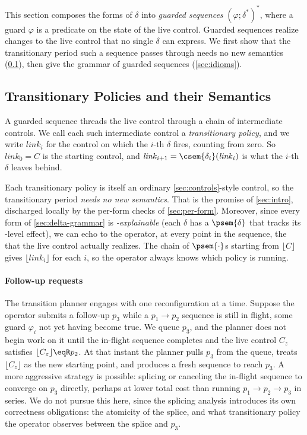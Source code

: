This section composes the forms of \(\delta\) into \emph{guarded sequences} \((\varphi ; \delta^{*})^{*}\), where a guard \(\varphi\) is a predicate on the state of the live control.
Guarded sequences realize changes to the live control that no single \(\delta\) can express.
We first show that the transitionary period such a sequence passes through needs no new semantics (\cref{sec:links}), then give the grammar of guarded sequences (\cref{sec:idioms}).

\subsection{Transitionary Policies and their Semantics}\label{sec:links}

A guarded sequence threads the live control through a chain of intermediate controls.
We call each such intermediate control a \emph{transitionary policy}, and we write \(\mathit{link}_i\) for the control on which the \(i\)-th \(\delta\) fires, counting from zero.
So \(\mathit{link}_0 = C\) is the starting control, and \(\mathit{link}_{i+1} = \csem{\delta_i}(\mathit{link}_i)\) is what the \(i\)-th \(\delta\) leaves behind.

Each transitionary policy is itself an ordinary \cref{sec:controls}-style control, so the transitionary period \emph{needs no new semantics}.
That is the promise of \cref{sec:intro}, discharged locally by the per-form checks of \cref{sec:per-form}.
Moreover, since every form of \cref{sec:delta-grammar} is \emph{\pol-explainable} (each \(\delta\) has a \(\psem{\delta}\) that tracks its \pol-level effect), we can echo to the operator, at every point in the sequence, the \pol that the live control actually realizes.
The chain of \(\psem{\cdot}\)s starting from \(\lfloor C \rfloor\) gives \(\lfloor \mathit{link}_i \rfloor\) for each \(i\), so the operator always knows which policy is running.

\paragraph{Follow-up requests}
The transition planner engages with one reconfiguration at a time.
Suppose the operator submits a follow-up \(p_3\) while a \(p_1 \to p_2\) sequence is still in flight, some guard \(\varphi_i\) not yet having become true.
We queue \(p_3\), and the planner does not begin work on it until the in-flight sequence completes and the live control \(C_z\) satisfies \(\lfloor C_z \rfloor \eqR p_2\).
At that instant the planner pulls \(p_3\) from the queue, treats \(\lfloor C_z \rfloor\) as the new starting point, and produces a fresh sequence to reach \(p_3\).
A more aggressive strategy is possible: splicing or canceling the in-flight sequence to converge on \(p_3\) directly, perhaps at lower total cost than running \(p_1 \to p_2 \to p_3\) in series.
We do not pursue this here, since the splicing analysis introduces its own correctness obligations: the atomicity of the splice, and what transitionary policy the operator observes between the splice and \(p_3\).

